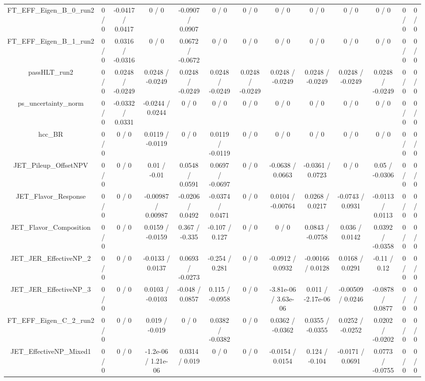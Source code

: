 \documentclass[10pt]{article}
\begin{document}
\begin{table}[htbp]
\begin{center}
\begin{tabular}{|c|c|c|c|c|c|c|c|c|c|c|c|c|}
  FT_EFF_Eigen_B_0_run2 & 0 / 0 & -0.0417 / 0.0417 & 0 / 0 & -0.0907 / 0.0907 & 0 / 0 & 0 / 0 & 0 / 0 & 0 / 0 & 0 / 0 & 0 / 0 & 0 / 0 & 0 / 0 \\ 
  FT_EFF_Eigen_B_1_run2 & 0 / 0 & 0.0316 / -0.0316 & 0 / 0 & 0.0672 / -0.0672 & 0 / 0 & 0 / 0 & 0 / 0 & 0 / 0 & 0 / 0 & 0 / 0 & 0 / 0 & 0 / 0 \\ 
  passHLT_run2 & 0 / 0 & 0.0248 / -0.0249 & 0.0248 / -0.0249 & 0.0248 / -0.0249 & 0.0248 / -0.0249 & 0.0248 / -0.0249 & 0.0248 / -0.0249 & 0.0248 / -0.0249 & 0.0248 / -0.0249 & 0.0248 / -0.0249 & 0 / 0 & 0 / 0 \\ 
  ps_uncertainty_norm & 0 / 0 & -0.0332 / 0.0331 & -0.0244 / 0.0244 & 0 / 0 & 0 / 0 & 0 / 0 & 0 / 0 & 0 / 0 & 0 / 0 & 0 / 0 & 0 / 0 & 0 / 0 \\ 
  hcc_BR & 0 / 0 & 0 / 0 & 0.0119 / -0.0119 & 0 / 0 & 0.0119 / -0.0119 & 0 / 0 & 0 / 0 & 0 / 0 & 0 / 0 & 0 / 0 & 0 / 0 & 0 / 0 \\ 
  JET_Pileup_OffsetNPV & 0 / 0 & 0 / 0 & 0.01 / -0.01 & 0.0548 / 0.0591 & 0.0697 / -0.0697 & 0 / 0 & -0.0638 / 0.0663 & -0.0361 / 0.0723 & 0 / 0 & 0.05 / -0.0306 & 0 / 0 & 0 / 0 \\ 
  JET_Flavor_Response & 0 / 0 & 0 / 0 & -0.00987 / 0.00987 & -0.0206 / 0.0492 & -0.0374 / 0.0471 & 0 / 0 & 0.0104 / -0.00764 & 0.0268 / 0.0217 & -0.0743 / 0.0931 & -0.0113 / 0.0113 & 0 / 0 & 0 / 0 \\ 
  JET_Flavor_Composition & 0 / 0 & 0 / 0 & 0.0159 / -0.0159 & 0.367 / -0.335 & -0.107 / 0.127 & 0 / 0 & 0 / 0 & 0.0843 / -0.0758 & 0.036 / 0.0142 & 0.0392 / -0.0358 & 0 / 0 & 0 / 0 \\ 
  JET_JER_EffectiveNP_2 & 0 / 0 & 0 / 0 & -0.0133 / 0.0137 & 0.0693 / -0.0273 & -0.254 / 0.281 & 0 / 0 & -0.0912 / 0.0932 & -0.00166 / 0.0128 & 0.0168 / 0.0291 & -0.11 / 0.12 & 0 / 0 & 0 / 0 \\ 
  JET_JER_EffectiveNP_3 & 0 / 0 & 0 / 0 & 0.0103 / -0.0103 & -0.048 / 0.0857 & 0.115 / -0.0958 & 0 / 0 & -3.81e-06 / 3.63e-06 & 0.011 / -2.17e-06 & -0.00509 / 0.0246 & -0.0878 / 0.0877 & 0 / 0 & 0 / 0 \\ 
  FT_EFF_Eigen_C_2_run2 & 0 / 0 & 0 / 0 & 0.019 / -0.019 & 0 / 0 & 0.0382 / -0.0382 & 0 / 0 & 0.0362 / -0.0362 & 0.0355 / -0.0355 & 0.0252 / -0.0252 & 0.0202 / -0.0202 & 0 / 0 & 0 / 0 \\ 
  JET_EffectiveNP_Mixed1 & 0 / 0 & 0 / 0 & -1.2e-06 / 1.21e-06 & 0.0314 / 0.019 & 0 / 0 & 0 / 0 & -0.0154 / 0.0154 & 0.124 / -0.104 & -0.0171 / 0.0691 & 0.0773 / -0.0755 & 0 / 0 & 0 / 0 \\ 

\end{tabular}
\end{center}
\end{table}
\end{document}
